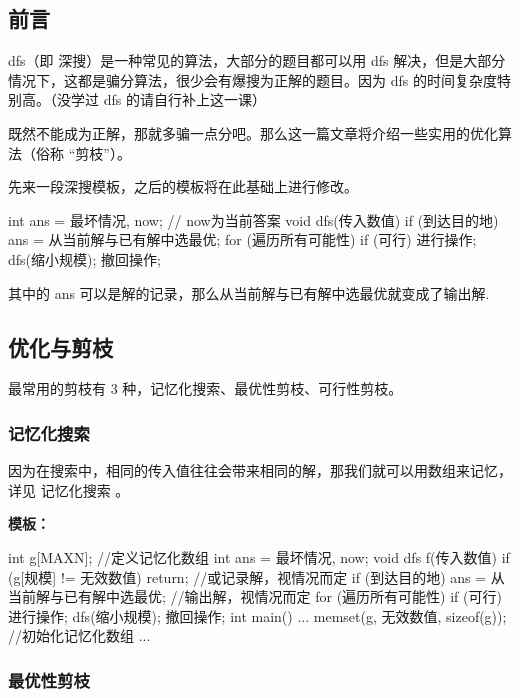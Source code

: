 
\subsection{前言}

dfs（即 深搜）是一种常见的算法，大部分的题目都可以用 dfs 解决，但是大部分情况下，这都是骗分算法，很少会有爆搜为正解的题目。因为 dfs 的时间复杂度特别高。（没学过 dfs 的请自行补上这一课）

既然不能成为正解，那就多骗一点分吧。那么这一篇文章将介绍一些实用的优化算法（俗称 “剪枝”）。

先来一段深搜模板，之后的模板将在此基础上进行修改。

\begin{cppcode}
int ans = 最坏情况, now;  // now为当前答案
void dfs(传入数值) {
  if (到达目的地) ans = 从当前解与已有解中选最优;
  for (遍历所有可能性)
    if (可行) {
      进行操作;
      dfs(缩小规模);
      撤回操作;
    }
}
\end{cppcode}

其中的 ans 可以是解的记录，那么从当前解与已有解中选最优就变成了输出解.

\subsection{优化与剪枝}

最常用的剪枝有 3 种，记忆化搜索、最优性剪枝、可行性剪枝。

\subsubsection{记忆化搜索}

因为在搜索中，相同的传入值往往会带来相同的解，那我们就可以用数组来记忆，详见 记忆化搜索 。

\textbf{模板：}

\begin{cppcode}
int g[MAXN];  //定义记忆化数组
int ans = 最坏情况, now;
void dfs f(传入数值) {
  if (g[规模] != 无效数值) return;  //或记录解，视情况而定
  if (到达目的地) ans = 从当前解与已有解中选最优;  //输出解，视情况而定
  for (遍历所有可能性)
    if (可行) {
      进行操作;
      dfs(缩小规模);
      撤回操作;
    }
}
int main() {
  ... memset(g, 无效数值, sizeof(g));  //初始化记忆化数组
  ...
}
\end{cppcode}

\subsubsection{最优性剪枝}

